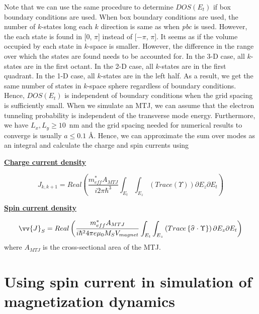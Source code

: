 Note that we can use the same procedure to determine $DOS(E_{t})$ if box boundary conditions are used. When box boundary conditions are used, the number of $k$-states long each $k$ direction is same as when \emph{pbc} is used. However, the each state is found in [0, $\pi$] instead of [$-\pi$, $\pi$]. It seems as if the volume occupied by each state in $k$-space is smaller. However, the difference in the range over which the states are found needs to be accounted for. In the 3-D case, all $k$-states are in the first octant. In the 2-D case, all $k$-states are in the first quadrant. In the 1-D case, all $k$-states are in the left half. As a result, we get the same number of states in $k$-space sphere regardless of boundary conditions. Hence, $DOS(E_{t})$ is independent of boundary conditions when the grid spacing is sufficiently small. When we simulate an MTJ, we can assume that the electron tunneling probability is independent of the transverse mode energy. Furthermore, we have $L_{x}, L_{y} \geq 10$~nm and the grid spacing needed for numerical results to converge is usually $a\leq0.1$ \AA. Hence, we can approximate the sum over modes as an integral and calculate the charge and spin currents using \begin{center}
\textbf{\underline{Charge current density}}
\end{center}
\begin{equation}\label{eq:negf_jcurr_mode3D}
J_{k,k+1} = Real \left(\frac{m^{*}_{eff}A_{MTJ}}{i2\pi\hbar^{3}} \int_{E_{t}}\int_{E_{z}} \left( Trace \left( \Upsilon \right)\right) \partial E_{z} \partial E_{t} \right)
\end{equation}\begin{center}
\textbf{\underline{Spin current density}}
\end{center}
\begin{equation}\label{eq:negf_js_mode3D}
\vv{J}_{S} = Real \left(\frac{m^{*}_{eff}A_{MTJ}}{i\hbar^{2}4\pi e\mu_{0}M_{S}V_{magnet}} \int_{E_{t}}\int_{E_{z}} \left( Trace \left\lbrace \widehat{\sigma} \cdot \Upsilon\right\rbrace\right) \partial E_{z} \partial E_{t} \right)
\end{equation}where $A_{MTJ}$ is the cross-sectional area of the MTJ.

\section{Using spin current in simulation of magnetization dynamics}

